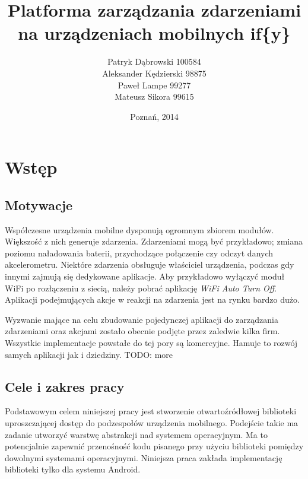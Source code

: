 \documentclass[11pt,a4paper,polish,thesis]{dcsbook}
\begin{document}
\author{Patryk Dąbrowski 100584\\ Aleksander Kędzierski 98875\\ Paweł Lampe 99277\\ Mateusz Sikora 99615}
\title{Platforma zarządzania zdarzeniami na urządzeniach mobilnych if\{y\}}
\date{Poznań, 2014}

\maketitle

\frontmatter

\tableofcontents{}

\mainmatter

\chapter{Wstęp}
\section{Motywacje}
Współczesne urządzenia mobilne dysponują ogromnym zbiorem modułów. Większość z nich generuje zdarzenia. Zdarzeniami mogą być przykładowo; zmiana poziomu naładowania
baterii, przychodzące połączenie czy odczyt danych akcelerometru. Niektóre zdarzenia obsługuje właściciel urządzenia, podczas gdy innymi zajmują się dedykowane
aplikacje. Aby przykładowo wyłączyć moduł WiFi po rozłączeniu z siecią, należy pobrać aplikację \emph{WiFi Auto Turn Off}. Aplikacji podejmujących akcje w reakcji
na zdarzenia jest na rynku bardzo dużo.

Wyzwanie mające na celu zbudowanie pojedynczej aplikacji do zarządzania zdarzeniami oraz akcjami zostało obecnie podjęte przez zaledwie kilka firm. Wszystkie
implementacje powstałe do tej pory są komercyjne. Hamuje to rozwój samych aplikacji jak i dziedziny. TODO: more
\section{Cele i zakres pracy}
Podstawowym celem niniejszej pracy jest stworzenie otwartoźródłowej biblioteki uproszczającej dostęp do podzespołów urządzenia mobilnego. Podejście takie ma zadanie
utworzyć warstwę abstrakcji nad systemem operacyjnym. Ma to potencjalnie zapewnić przenośność kodu pisanego przy użyciu biblioteki pomiędzy dowolnymi systemami
operacyjnymi. Niniejsza praca zakłada implementację biblioteki tylko dla systemu Android.
\end{document}
